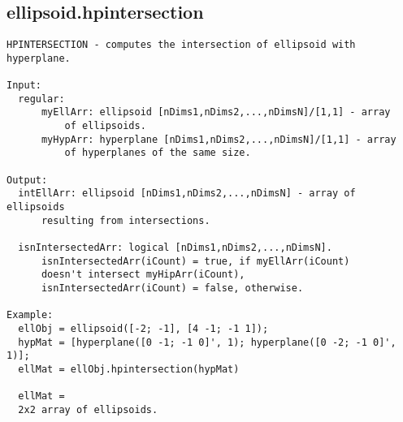 \subsection{\texorpdfstring{ellipsoid.hpintersection}{hpintersection}}\label{method:ellipsoid.hpintersection}
\begin{verbatim}
HPINTERSECTION - computes the intersection of ellipsoid with hyperplane.

Input:
  regular:
      myEllArr: ellipsoid [nDims1,nDims2,...,nDimsN]/[1,1] - array
          of ellipsoids.
      myHypArr: hyperplane [nDims1,nDims2,...,nDimsN]/[1,1] - array
          of hyperplanes of the same size.

Output:
  intEllArr: ellipsoid [nDims1,nDims2,...,nDimsN] - array of ellipsoids
      resulting from intersections.

  isnIntersectedArr: logical [nDims1,nDims2,...,nDimsN].
      isnIntersectedArr(iCount) = true, if myEllArr(iCount)
      doesn't intersect myHipArr(iCount),
      isnIntersectedArr(iCount) = false, otherwise.

Example:
  ellObj = ellipsoid([-2; -1], [4 -1; -1 1]);
  hypMat = [hyperplane([0 -1; -1 0]', 1); hyperplane([0 -2; -1 0]', 1)];
  ellMat = ellObj.hpintersection(hypMat)

  ellMat =
  2x2 array of ellipsoids.
\end{verbatim}
